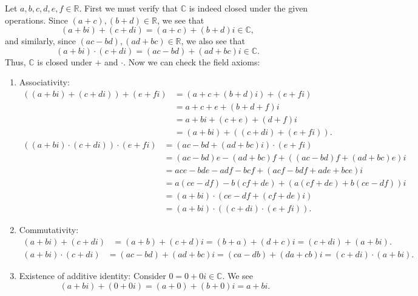 \begin{sltn}[\ref{exer:cfield}]
Let $ a,b,c,d,e,f\in\mathbb{R} $. First we must verify that $ \mathbb{C} $ is indeed closed under the given operations. Since $ (a+c),(b+d)\in\mathbb{R} $, we see that
\begin{equation*}
    (a+bi)+(c+di)=(a+c)+(b+d)i\in\mathbb{C},
\end{equation*}
and similarly, since $ (ac-bd),(ad+bc)\in\mathbb{R} $, we also see that
\begin{equation*}
    (a+bi)\cdot(c+di)=(ac-bd)+(ad+bc)i\in\mathbb{C}.
\end{equation*}
Thus, $ \mathbb{C} $ is closed under $ + $ and $ \cdot $. Now we can check the field axioms:
\begin{enumerate}
    \item Associativity:
    \begin{align*}
        ((a+bi)+(c+di))+(e+fi) &= (a+c+(b+d)i)+(e+fi) \\
        &= a+c+e+(b+d+f)i \\
        &= a+bi+(c+e)+(d+f)i \\
        &= (a+bi)+((c+di)+(e+fi)).
    \end{align*}
    \begin{align*}
        ((a+bi)\cdot(c+di))\cdot(e+fi) &= (ac-bd+(ad+bc)i)\cdot(e+fi) \\
        &= (ac-bd)e-(ad+bc)f+((ac-bd)f+(ad+bc)e)i \\
        &= ace-bde-adf-bcf+(acf-bdf+ade+bce)i \\
        &= a(ce-df)-b(cf+de)+(a(cf+de)+b(ce-df))i \\
        &= (a+bi)\cdot(ce-df+(cf+de)i) \\
        &= (a+bi)\cdot((c+di)\cdot(e+fi)).
    \end{align*}

    \item Commutativity:
    \begin{align*}
        (a+bi)+(c+di) &= (a+b)+(c+d)i=(b+a)+(d+c)i=(c+di)+(a+bi).
    \end{align*}
    \begin{align*}
        (a+bi)\cdot(c+di) &= (ac-bd)+(ad+bc)i=(ca-db)+(da+cb)i=(c+di)\cdot(a+bi).
    \end{align*}

    \item Existence of additive identity: Consider $ 0=0+0i\in\mathbb{C} $. We see
    \begin{equation*}
        (a+bi)+(0+0i)=(a+0)+(b+0)i=a+bi.
    \end{equation*}


\end{enumerate}
\end{sltn}
